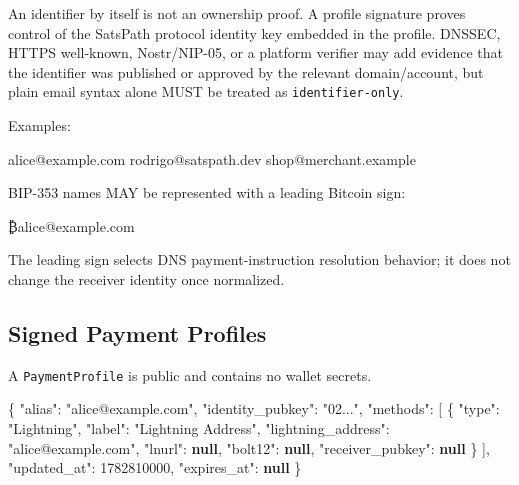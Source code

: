 \documentclass[
]{article}
\newenvironment{Shaded}{}{}
\newcommand{\DataTypeTok}[1]{\textcolor[rgb]{0.56,0.13,0.00}{#1}}
\newcommand{\DecValTok}[1]{\textcolor[rgb]{0.25,0.63,0.44}{#1}}
\newcommand{\FunctionTok}[1]{\textcolor[rgb]{0.02,0.16,0.49}{#1}}
\newcommand{\KeywordTok}[1]{\textcolor[rgb]{0.00,0.44,0.13}{\textbf{#1}}}
\newcommand{\NormalTok}[1]{#1}
\newcommand{\OtherTok}[1]{\textcolor[rgb]{0.00,0.44,0.13}{#1}}
\newcommand{\StringTok}[1]{\textcolor[rgb]{0.25,0.44,0.63}{#1}}
\begin{document}
An identifier by itself is not an ownership proof. A profile signature
proves control of the SatsPath protocol identity key embedded in the
profile. DNSSEC, HTTPS well-known, Nostr/NIP-05, or a platform verifier
may add evidence that the identifier was published or approved by the
relevant domain/account, but plain email syntax alone MUST be treated as
\texttt{identifier-only}.

Examples:

\begin{Shaded}
\begin{Highlighting}[]
\NormalTok{alice@example.com}
\NormalTok{rodrigo@satspath.dev}
\NormalTok{shop@merchant.example}
\end{Highlighting}
\end{Shaded}

BIP-353 names MAY be represented with a leading Bitcoin sign:

\begin{Shaded}
\begin{Highlighting}[]
\NormalTok{₿alice@example.com}
\end{Highlighting}
\end{Shaded}

The leading sign selects DNS payment-instruction resolution behavior; it
does not change the receiver identity once normalized.

\hypertarget{signed-payment-profiles}{%
\subsection{Signed Payment Profiles}\label{signed-payment-profiles}}

A \texttt{PaymentProfile} is public and contains no wallet secrets.

\begin{Shaded}
\begin{Highlighting}[]
\FunctionTok{\{}
  \DataTypeTok{"alias"}\FunctionTok{:} \StringTok{"alice@example.com"}\FunctionTok{,}
  \DataTypeTok{"identity\_pubkey"}\FunctionTok{:} \StringTok{"02..."}\FunctionTok{,}
  \DataTypeTok{"methods"}\FunctionTok{:} \OtherTok{[}
    \FunctionTok{\{}
      \DataTypeTok{"type"}\FunctionTok{:} \StringTok{"Lightning"}\FunctionTok{,}
      \DataTypeTok{"label"}\FunctionTok{:} \StringTok{"Lightning Address"}\FunctionTok{,}
      \DataTypeTok{"lightning\_address"}\FunctionTok{:} \StringTok{"alice@example.com"}\FunctionTok{,}
      \DataTypeTok{"lnurl"}\FunctionTok{:} \KeywordTok{null}\FunctionTok{,}
      \DataTypeTok{"bolt12"}\FunctionTok{:} \KeywordTok{null}\FunctionTok{,}
      \DataTypeTok{"receiver\_pubkey"}\FunctionTok{:} \KeywordTok{null}
    \FunctionTok{\}}
  \OtherTok{]}\FunctionTok{,}
  \DataTypeTok{"updated\_at"}\FunctionTok{:} \DecValTok{1782810000}\FunctionTok{,}
  \DataTypeTok{"expires\_at"}\FunctionTok{:} \KeywordTok{null}
\FunctionTok{\}}
\end{Highlighting}
\end{Shaded}
\end{document}
